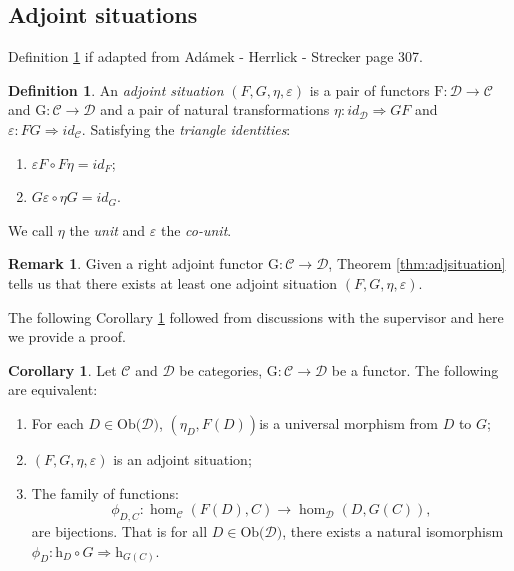 \documentclass[11pt,a4paper]{article}
\theoremstyle{definition}
\newtheorem{cor}[thm]{Corollary}
\newtheorem{definition}[thm]{Definition}
\newtheorem{remark}[thm]{Remark}
\newcommand\ho[3][]{\hom_{#1}(#2,#3)}
\newcommand\ob[1]{\mathrm{Ob(}#1\mathrm{)}}
\newcommand\cat[1]{\mathscr{#1}}
\newcommand\func[3]{\mathrm{#1}\colon#2\rightarrow#3}
\newcommand\nattran[3]{#1\colon#2\Rightarrow#3}
\numberwithin{equation}{section}
\begin{document}
\subsection{Adjoint situations}
\label{ss:adjsitu}

Definition \ref{def:adjsituations} if adapted from Adámek - Herrlick - Strecker \cite{ACC} page 307.
\begin{definition}
    \label{def:adjsituations}
    An \emph{adjoint situation} $(F,G,\eta,\varepsilon)$ is a pair of functors $\func{F}{\cat{D}}{\cat{C}}$ and $\func{G}{\cat{C}}{\cat{D}}$ and a pair of natural transformations $\nattran{\eta}{id_{\cat{D}}}{GF}$ and $\nattran{\varepsilon}{FG}{id_{\cat{C}}}$. 
    Satisfying the \emph{triangle identities}:
    \begin{enumerate}
        \item $\varepsilon F \circ F\eta = id_{F}$;
        \item $G\varepsilon \circ \eta G = id_{G}$.
    \end{enumerate}
    We call $\eta$ the \emph{unit} and $\varepsilon$ the \emph{co-unit}.
\end{definition}
\begin{remark}
    Given a right adjoint functor $\func{G}{\cat{C}}{\cat{D}}$, Theorem \ref{thm:adjsituation} tells us that there exists at least one adjoint situation $(F,G,\eta,\varepsilon)$.
\end{remark}
The following Corollary \ref{cor:homdefadj} followed from discussions with the supervisor and here we provide a proof.
\begin{cor}
    \label{cor:homdefadj}
    Let $\cat{C}$ and $\cat{D}$ be categories, $\func{G}{\cat{C}}{\cat{D}}$ be a functor. 
    The following are equivalent:
    \begin{enumerate}
    \item For each $D\in\ob{\cat{D}}$, $(\eta_{D},F(D))$is a universal morphism from $D$ to $G$;
    \item $(F,G,\eta,\varepsilon)$ is an adjoint situation;
    \item The family of functions: 
    \[\phi_{D,C}\colon \ho[\cat{C}]{F(D)}{C}\to \ho[\cat{D}]{D}{G(C)},\] are bijections. That is for all $D\in\ob{\cat{D}}$, there exists a natural isomorphism $\nattran{\phi_{D}}{\mathrm{h}_{D}\circ G}{\mathrm{h}_{G(C)}}$.
    \end{enumerate}
\end{cor}
\end{document}
